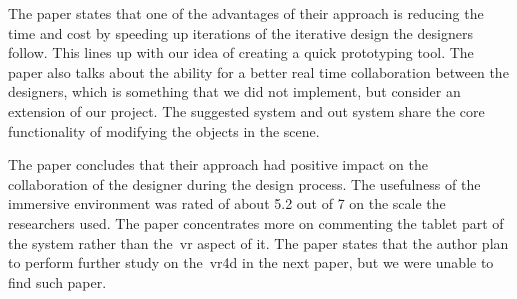 The paper states that one of the advantages of their approach is reducing the time and cost by speeding up iterations of the iterative design the designers follow. This lines up with our idea of creating a quick prototyping tool. The paper also talks about the ability for a better real time collaboration between the designers, which is something that we did not implement, but consider an extension of our project. The suggested system and out system share the core functionality of modifying the objects in the scene.

The paper concludes that their approach had positive impact on the collaboration of the designer during the design process. The usefulness of the immersive environment was rated of about 5.2 out of 7 on the scale the researchers used. The paper concentrates more on commenting the tablet part of the system rather than the~\acrshort{vr} aspect of it. The paper states that the author plan to perform further study on the~\acrshort{vr4d} in the next paper, but we were unable to find such paper.